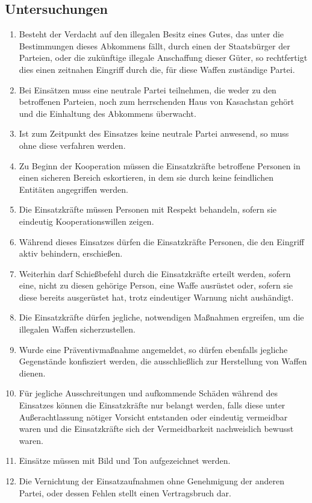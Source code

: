 \documentclass{article}
\begin{document}
\subsection{Untersuchungen}
\begin{enumerate}[(1)]
    \item Besteht der Verdacht auf den illegalen Besitz eines Gutes, das unter die Bestimmungen dieses Abkommens fällt, durch einen der Staatsbürger der Parteien, oder die zukünftige illegale Anschaffung dieser Güter, so rechtfertigt dies einen zeitnahen Eingriff durch die, für diese Waffen zuständige Partei.
    \item Bei Einsätzen muss eine neutrale Partei teilnehmen, die weder zu den betroffenen Parteien, noch zum herrschenden Haus von Kasachstan gehört und die Einhaltung des Abkommens überwacht.
    \item Ist zum Zeitpunkt des Einsatzes keine neutrale Partei anwesend, so muss ohne diese verfahren werden.
    \item Zu Beginn der Kooperation müssen die Einsatzkräfte betroffene Personen in einen sicheren Bereich eskortieren, in dem sie durch keine feindlichen Entitäten angegriffen werden.
    \item Die Einsatzkräfte müssen Personen mit Respekt behandeln, sofern sie eindeutig Kooperationswillen zeigen.
    \item Während dieses Einsatzes dürfen die Einsatzkräfte Personen, die den Eingriff aktiv behindern, erschießen.
    \item Weiterhin darf Schießbefehl durch die Einsatzkräfte erteilt werden, sofern eine, nicht zu diesen gehörige Person, eine Waffe ausrüstet oder, sofern sie diese bereits ausgerüstet hat, trotz eindeutiger Warnung nicht aushändigt.
    \item Die Einsatzkräfte dürfen jegliche, notwendigen Maßnahmen ergreifen, um die illegalen Waffen sicherzustellen.
    \item Wurde eine Präventivmaßnahme angemeldet, so dürfen ebenfalls jegliche Gegenstände konfisziert werden, die ausschließlich zur Herstellung von Waffen dienen.
    \item Für jegliche Ausschreitungen und aufkommende Schäden während des Einsatzes können die Einsatzkräfte nur belangt werden, falls diese unter Außerachtlassung nötiger Vorsicht entstanden oder eindeutig vermeidbar waren und die Einsatzkräfte sich der Vermeidbarkeit nachweislich bewusst waren.
    \item Einsätze müssen mit Bild und Ton aufgezeichnet werden.
    \item Die Vernichtung der Einsatzaufnahmen ohne Genehmigung der anderen Partei, oder dessen Fehlen stellt einen Vertragsbruch dar.
\end{enumerate}
\end{document}
